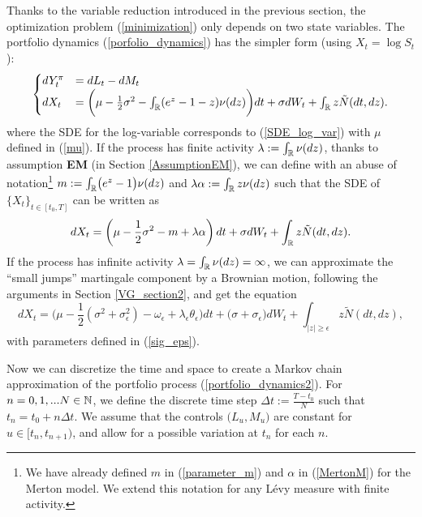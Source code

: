 Thanks to the variable reduction introduced in the previous section, the optimization problem (\ref{minimization}) only depends on two state variables. 
The portfolio dynamics (\ref{porfolio_dynamics}) has the simpler form (using $X_t = \log S_t$):
\begin{equation}\label{portfolio_dynamics2}
 \begin{cases}
 dY^{\pi}_t &=  dL_t - dM_t \\
 dX_t &= \biggl( \mu - \frac{1}{2} \sigma^2 - \int_{\mathbb{R}} (e^z-1-z) \nu(dz) \biggr) dt + \sigma dW_t + \int_{\mathbb{R}} z \tilde N (dt,dz).
\end{cases}
\end{equation} 
where the SDE for the log-variable corresponds to (\ref{SDE_log_var}) with $\mu$ defined in (\ref{mu}).
If the process has finite activity $\lambda := \int_{\mathbb{R}} \nu(dz)$, thanks to assumption \textbf{EM} (in Section \ref{AssumptionEM}),
we can define with an abuse of notation\footnote{We have already defined $m$ in (\ref{parameter_m}) and $\alpha$ in (\ref{MertonM}) for the Merton model. 
We extend this notation for any Lévy measure with finite activity.}
$m := \int_{\mathbb{R}} \bigl( e^z -1 \bigr) \nu(dz)$ and $\lambda \alpha := \int_{\mathbb{R}} z \nu(dz)$ such that the SDE of $\{X_t\}_{t \in [t_0,T]}$ can be written as 
\begin{equation}\label{log_sde_fin_act2} 
 dX_t = \biggl( \mu - \frac{1}{2}\sigma^2 -m + \lambda \alpha \biggr) \,dt + \sigma dW_t + \int_{\mathbb{R}} z \tilde N(dt,dz). \\
\end{equation}
If the process has infinite activity $\lambda = \int_{\mathbb{R}} \nu(dz) = \infty$, 
we can approximate the ``small jumps'' martingale component by a Brownian motion, following the arguments in Section \ref{VG_section2}, and get the equation 
\begin{equation}\label{log_sde_inf_act2}
   dX_t = \biggl( \mu - \frac{1}{2} (\sigma^2 + \sigma_{\epsilon}^2) - \omega_{\epsilon} + \lambda_{\epsilon} \theta_{\epsilon}  \biggr) dt + \bigl( \sigma+\sigma_{\epsilon}\bigr) dW_t 
       + \int_{|z|\geq \epsilon} z \tilde N(dt,dz), 
\end{equation}
with parameters defined in (\ref{sig_eps}).

Now we can discretize the time and space to create a Markov chain approximation of the portfolio process (\ref{portfolio_dynamics2}).
For $n = 0,1, ... N \in \mathbb{N}$, we define the discrete time step $ \Delta t := \frac{T - t_0}{N} $ such that
$t_n = t_0 + n \Delta t$.
We assume that the controls $\bigl(L_u,M_u\bigr)$ are constant for $u \in [t_n,t_{n+1})$, and allow for a possible variation at $t_n$ for each $n$.

